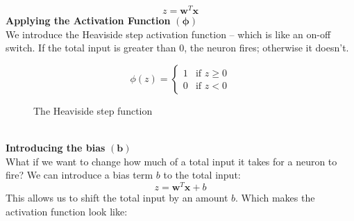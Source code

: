 \documentclass[9pt]{extarticle}
\theoremstyle{plain}
\theoremstyle{definition}
\theoremstyle{remark}
\begin{document}
$$z = \mathbf{w}^T \mathbf{x}$$
\textbf{Applying the Activation Function} $\boldsymbol{(\phi)}$\\[2ex]
We introduce the Heaviside step activation function – which is like an on-off switch. If the total input is greater than $0$, the neuron fires; otherwise it doesn't.
\begin{figure}[h]
    \centering
    \begin{subfigure}[c]{0.49\textwidth}
        \centering
        $$\phi(z) = \begin{cases}
                1 & \text{if } z \geq 0 \\
                0 & \text{if } z < 0
            \end{cases}
        $$
    \end{subfigure}
    \begin{subfigure}[c]{0.5\textwidth}
        \centering
    \end{subfigure}
    \caption{The Heaviside step function}
\end{figure} \\
\textbf{Introducing the bias} $\boldsymbol{(b)}$\\[2ex]
What if we want to change how much of a total input it takes for a neuron to fire? We can introduce a bias term $b$ to the total input:
$$z = \mathbf{w}^T \mathbf{x} + b$$
This allows us to shift the total input by an amount $b$. Which makes the activation function look like:
\end{document}
